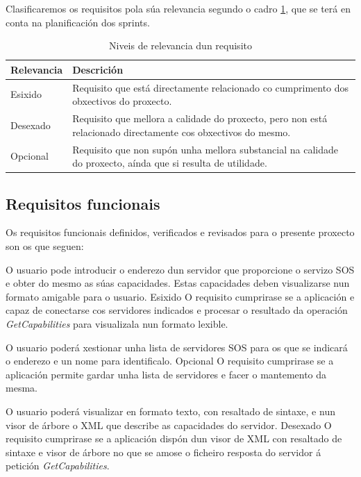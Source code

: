 Clasificaremos os requisitos pola súa relevancia segundo o cadro \ref{tab:relevanciaReq}, que se terá en conta na planificación dos sprints.
\begin{table}
\begin{tabularx}{\textwidth}{lX} \toprule
	Relevancia & Descrición \\
	\midrule
	Esixido & Requisito que está directamente relacionado co cumprimento dos obxectivos do proxecto.\\
	Desexado & Requisito que mellora a calidade do proxecto, pero non está relacionado directamente cos obxectivos do mesmo.\\
	Opcional &  Requisito que non supón unha mellora substancial na calidade do proxecto, aínda que si resulta de utilidade.\\
	\bottomrule
\end{tabularx}
\caption{Niveis de relevancia dun requisito}
\label{tab:relevanciaReq}
\end{table}

\subsection{Requisitos funcionais}
Os requisitos funcionais definidos, verificados e revisados para o presente proxecto son os que seguen:

		  	{O usuario pode introducir o enderezo dun servidor que proporcione o servizo SOS e obter do mesmo as súas capacidades. Estas capacidades deben visualizarse nun formato amigable para o usuario.}%
			{Esixido}%
			{O requisito cumprirase se a aplicación e capaz de conectarse cos servidores indicados e procesar o resultado da operación \emph{GetCapabilities} para visualizala nun formato lexible.}%
			
		  	{O usuario poderá xestionar unha lista de servidores SOS para os que se indicará o enderezo e un nome para identificalo.}%
			{Opcional}%
			{O requisito cumprirase se a aplicación permite gardar unha lista de servidores e facer o mantemento da mesma.}%
			
		  	{O usuario poderá visualizar en formato texto, con resaltado de sintaxe, e nun visor de árbore o XML que describe as capacidades do servidor.}%
			{Desexado}%
			{O requisito cumprirase se a aplicación dispón dun visor de XML con resaltado de sintaxe e visor de árbore no que se amose o ficheiro resposta do servidor á petición \emph{GetCapabilities}.}%
			
